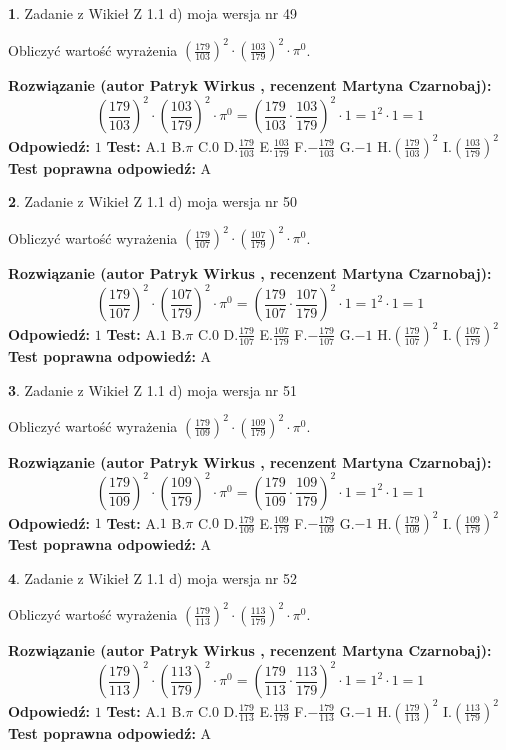 \documentclass[12pt, a4paper]{article}
\theoremstyle{definition} %
\newtheorem{zad}{}
\newcommand{\zadStart}[1]{\begin{zad}#1\newline}
\newcommand{\zadStop}{\end{zad}}
\newcommand{\rozwStart}[2]{\noindent \textbf{Rozwiązanie (autor #1 , recenzent #2): }\newline}
\newcommand{\rozwStop}{\newline}
\newcommand{\odpStart}{\noindent \textbf{Odpowiedź:}\newline}
\newcommand{\odpStop}{\newline}
\newcommand{\testStart}{\noindent \textbf{Test:}\newline}
\newcommand{\testStop}{\newline}
\newcommand{\kluczStart}{\noindent \textbf{Test poprawna odpowiedź:}\newline}
\newcommand{\kluczStop}{\newline}
\begin{document}
\zadStart{Zadanie z Wikieł Z 1.1 d) moja wersja nr 49}

Obliczyć wartość wyrażenia $(\frac{179}{103})^{2} \cdot (\frac{103}{179})^{2} \cdot \pi^{0}$.
\zadStop
\rozwStart{Patryk Wirkus}{Martyna Czarnobaj}
$$(\frac{179}{103})^{2} \cdot (\frac{103}{179})^{2} \cdot \pi^{0} = (\frac{179}{103} \cdot \frac{103}{179})^{2} \cdot 1 = 1^{2} \cdot 1 = 1$$
\rozwStop
\odpStart
$1$
\odpStop
\testStart
A.$1$ B.$\pi$ C.$0$ D.$\frac{179}{103}$ E.$\frac{103}{179}$
F.$-\frac{179}{103}$ G.$-1$
H.$(\frac{179}{103})^{2}$
I.$(\frac{103}{179})^{2}$
\testStop
\kluczStart
A
\kluczStop



\zadStart{Zadanie z Wikieł Z 1.1 d) moja wersja nr 50}

Obliczyć wartość wyrażenia $(\frac{179}{107})^{2} \cdot (\frac{107}{179})^{2} \cdot \pi^{0}$.
\zadStop
\rozwStart{Patryk Wirkus}{Martyna Czarnobaj}
$$(\frac{179}{107})^{2} \cdot (\frac{107}{179})^{2} \cdot \pi^{0} = (\frac{179}{107} \cdot \frac{107}{179})^{2} \cdot 1 = 1^{2} \cdot 1 = 1$$
\rozwStop
\odpStart
$1$
\odpStop
\testStart
A.$1$ B.$\pi$ C.$0$ D.$\frac{179}{107}$ E.$\frac{107}{179}$
F.$-\frac{179}{107}$ G.$-1$
H.$(\frac{179}{107})^{2}$
I.$(\frac{107}{179})^{2}$
\testStop
\kluczStart
A
\kluczStop



\zadStart{Zadanie z Wikieł Z 1.1 d) moja wersja nr 51}

Obliczyć wartość wyrażenia $(\frac{179}{109})^{2} \cdot (\frac{109}{179})^{2} \cdot \pi^{0}$.
\zadStop
\rozwStart{Patryk Wirkus}{Martyna Czarnobaj}
$$(\frac{179}{109})^{2} \cdot (\frac{109}{179})^{2} \cdot \pi^{0} = (\frac{179}{109} \cdot \frac{109}{179})^{2} \cdot 1 = 1^{2} \cdot 1 = 1$$
\rozwStop
\odpStart
$1$
\odpStop
\testStart
A.$1$ B.$\pi$ C.$0$ D.$\frac{179}{109}$ E.$\frac{109}{179}$
F.$-\frac{179}{109}$ G.$-1$
H.$(\frac{179}{109})^{2}$
I.$(\frac{109}{179})^{2}$
\testStop
\kluczStart
A
\kluczStop



\zadStart{Zadanie z Wikieł Z 1.1 d) moja wersja nr 52}

Obliczyć wartość wyrażenia $(\frac{179}{113})^{2} \cdot (\frac{113}{179})^{2} \cdot \pi^{0}$.
\zadStop
\rozwStart{Patryk Wirkus}{Martyna Czarnobaj}
$$(\frac{179}{113})^{2} \cdot (\frac{113}{179})^{2} \cdot \pi^{0} = (\frac{179}{113} \cdot \frac{113}{179})^{2} \cdot 1 = 1^{2} \cdot 1 = 1$$
\rozwStop
\odpStart
$1$
\odpStop
\testStart
A.$1$ B.$\pi$ C.$0$ D.$\frac{179}{113}$ E.$\frac{113}{179}$
F.$-\frac{179}{113}$ G.$-1$
H.$(\frac{179}{113})^{2}$
I.$(\frac{113}{179})^{2}$
\testStop
\kluczStart
A
\kluczStop
\end{document}
